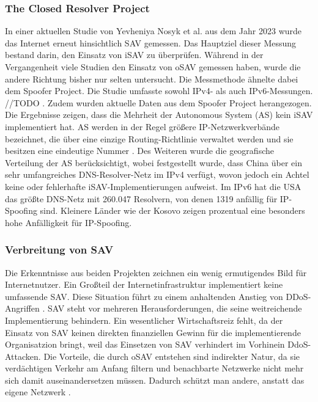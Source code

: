 \documentclass[sigplan,screen]{acmart}
\begin{document}
\subsubsection{The Closed Resolver Project}
In einer aktuellen Studie von Yevheniya Nosyk et al. aus dem Jahr 2023 \cite{CRP01} wurde das Internet erneut hinsichtlich SAV gemessen. Das Hauptziel dieser Messung bestand darin, den Einsatz von iSAV zu überprüfen. Während in der Vergangenheit viele Studien den Einsatz von oSAV gemessen haben, wurde die andere Richtung bisher nur selten untersucht. Die Messmethode ähnelte dabei dem Spoofer Project. Die Studie umfasste sowohl IPv4- als auch IPv6-Messungen. //TODO . Zudem wurden aktuelle Daten aus dem Spoofer Project herangezogen. Die Ergebnisse zeigen, dass die Mehrheit der Autonomous System (AS) kein iSAV implementiert hat. AS werden in der Regel größere IP-Netzwerkverbände bezeichnet, die über eine einzige Routing-Richtlinie verwaltet werden und sie besitzen eine eindeutige Nummer \cite{as01}. Des Weiteren wurde die geografische Verteilung der AS berücksichtigt, wobei festgestellt wurde, dass China über ein sehr umfangreiches DNS-Resolver-Netz im IPv4 verfügt, wovon jedoch ein Achtel keine oder fehlerhafte iSAV-Implementierungen aufweist. Im IPv6 hat die USA das größte DNS-Netz mit 260.047 Resolvern, von denen 1319 anfällig für IP-Spoofing sind. Kleinere Länder wie der Kosovo zeigen prozentual eine besonders hohe Anfälligkeit für IP-Spoofing.

\subsubsection{Verbreitung von SAV}

Die Erkenntnisse aus beiden Projekten zeichnen ein wenig ermutigendes Bild für Internetnutzer. Ein Großteil der Internetinfrastruktur implementiert keine umfassende SAV. Diese Situation führt zu einem anhaltenden Anstieg von DDoS-Angriffen \cite{CRP01}. SAV steht vor mehreren Herausforderungen, die seine weitreichende Implementierung behindern. 
Ein wesentlicher Wirtschaftsreiz fehlt, da der Einsatz von SAV keinen direkten finanziellen Gewinn für die implementierende Organisatzion bringt, weil das Einsetzen von SAV verhindert im Vorhinein DdoS-Attacken. Die Vorteile, die durch oSAV entstehen sind indirekter Natur, da sie verdächtigen Verkehr am Anfang filtern und benachbarte Netzwerke nicht mehr sich damit auseinandersetzen müssen. Dadurch schützt man andere, anstatt das eigene Netzwerk \cite{CRP01}.
\end{document}
